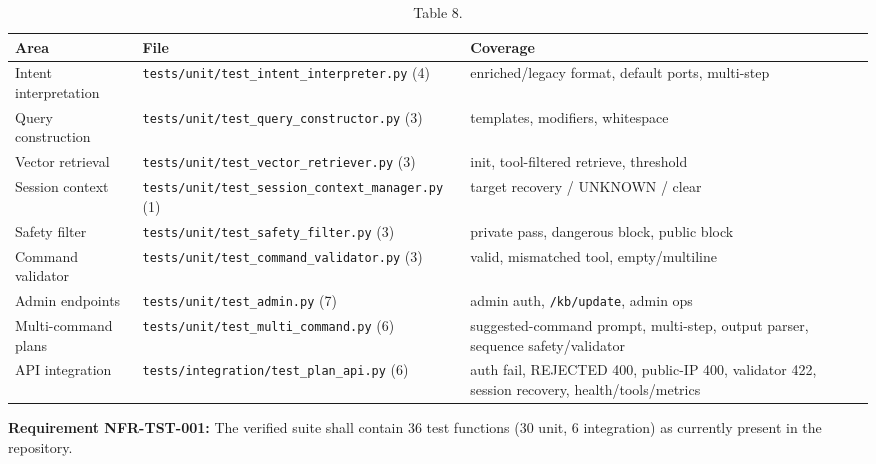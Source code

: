 \documentclass[10pt,journal,onecolumn]{IEEEtran}
\newcommand{\reqid}[1]{\textbf{#1}}
\begin{document}
\begin{table}[h]
\caption{Table 8.}
\label{tab:t8}
\begin{tabularx}{\columnwidth}{l >{\raggedright\arraybackslash}X >{\raggedright\arraybackslash}X}
\toprule
\textbf{Area} & \textbf{File} & \textbf{Coverage}\\
\midrule
Intent interpretation & \texttt{tests/\allowbreak unit/\allowbreak test\_\allowbreak intent\_\allowbreak interpreter.\allowbreak py} (4) & enriched/legacy format, default ports, multi-step\\
Query construction & \texttt{tests/\allowbreak unit/\allowbreak test\_\allowbreak query\_\allowbreak constructor.\allowbreak py} (3) & templates, modifiers, whitespace\\
Vector retrieval & \texttt{tests/\allowbreak unit/\allowbreak test\_\allowbreak vector\_\allowbreak retriever.\allowbreak py} (3) & init, tool-filtered retrieve, threshold\\
Session context & \texttt{tests/\allowbreak unit/\allowbreak test\_\allowbreak session\_\allowbreak context\_\allowbreak manager.\allowbreak py} (1) & target recovery / UNKNOWN / clear\\
Safety filter & \texttt{tests/\allowbreak unit/\allowbreak test\_\allowbreak safety\_\allowbreak filter.\allowbreak py} (3) & private pass, dangerous block, public block\\
Command validator & \texttt{tests/\allowbreak unit/\allowbreak test\_\allowbreak command\_\allowbreak validator.\allowbreak py} (3) & valid, mismatched tool, empty/multiline\\
Admin endpoints & \texttt{tests/\allowbreak unit/\allowbreak test\_\allowbreak admin.\allowbreak py} (7) & admin auth, \texttt{/kb/update}, admin ops\\
Multi-command plans & \texttt{tests/\allowbreak unit/\allowbreak test\_\allowbreak multi\_\allowbreak command.\allowbreak py} (6) & suggested-command prompt, multi-step, output parser, sequence safety/validator\\
API integration & \texttt{tests/\allowbreak integration/\allowbreak test\_\allowbreak plan\_\allowbreak api.\allowbreak py} (6) & auth fail, REJECTED 400, public-IP 400, validator 422, session recovery, health/tools/metrics\\
\bottomrule
\end{tabularx}
\end{table}

\reqid{Requirement NFR-TST-001:} The verified suite shall contain 36 test functions (30 unit, 6 integration) as currently present in the repository.
\end{document}
